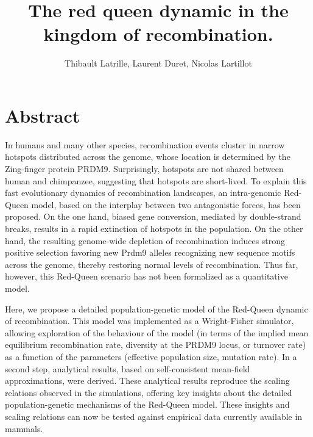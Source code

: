 \documentclass{article}
\author{Thibault Latrille, Laurent Duret, Nicolas Lartillot}
\title{The red queen dynamic in the kingdom of recombination.}
\begin{document}
\maketitle 

\newcommand{\avg}[1]{\left< #1 \right>} %
\newcommand{\Ne}{N_\mathrm{e}}
\newcommand{\Rp}{\theta}
\newcommand{\R}{R}
\newcommand{\Rt}{\R_{t}}
\newcommand{\D}{D}
\newcommand{\Dt}{\D_{t}}
\newcommand{\V}{V}
\newcommand{\Vt}{\V_{t}}
\newcommand{\T}{T}
\newcommand{\Rmin}{{\R_{\infty}}}
\newcommand{\dd}{\mathrm{d}}


\newcommand{\Lr}{L}
\newcommand{\Lmin}{\Lr_{\infty}}
\newcommand{\Lmina}{\alpha}
\newcommand{\Lminb}{\beta}
\newcommand{\Lra}{\gamma}
\newcommand{\Lrb}{\delta}

\section*{Abstract}
In humans and many other species, recombination events cluster in narrow hotspots distributed across the genome, whose location is determined by the Zing-finger protein PRDM9. Surprisingly, hotspots are not shared between human and chimpanzee, suggesting that hotspots are short-lived. To explain this fast evolutionary dynamics of recombination landscapes, an intra-genomic Red-Queen model, based on the interplay between two antagonistic forces, has been proposed. On the one hand, biased gene conversion, mediated by double-strand breaks, results in a rapid extinction of hotspots in the population. On the other hand, the resulting genome-wide depletion of recombination induces strong positive selection favoring new Prdm9 alleles recognizing new sequence motifs across the genome, thereby restoring normal levels of recombination. Thus far, however, this Red-Queen scenario has not been formalized as a quantitative model.

Here, we propose a detailed population-genetic model of the Red-Queen dynamic of recombination. This model was implemented as a Wright-Fisher simulator, allowing exploration of the behaviour of the model (in terms of the implied mean equilibrium recombination rate, diversity at the PRDM9 locus, or turnover rate) as a function of the parameters (effective population size, mutation rate). In a second step, analytical results, based on self-consistent mean-field approximations, were derived. These analytical results reproduce the scaling relations observed in the simulations, offering key insights about the detailed population-genetic mechanisms of the Red-Queen model. These insights and scaling relations can now be tested against empirical data currently available in mammals.
\end{document}
